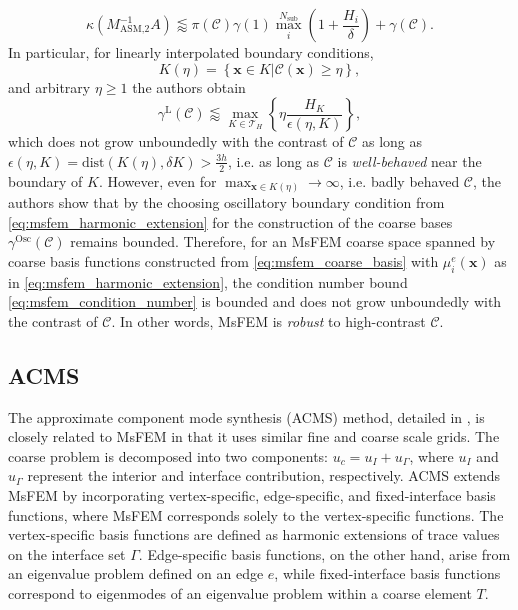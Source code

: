 \begin{equation}
    \kappa(M^{-1}_{\text{ASM,2}}A) \lessapprox \pi(\mathcal{C})\gamma(1)\max_i^{N_{\text{sub}}}\left(1+\frac{H_i}{\delta}\right) + \gamma(\mathcal{C}).
    \label{eq:msfem_condition_number}
\end{equation}
In particular, for linearly interpolated boundary conditions, 
\[
    K(\eta) = \left\{\mathbf{x} \in K | \mathcal{C}(\mathbf{x}) \geq \eta\right\},
\]
and arbitrary $\eta\geq 1$ the authors obtain \cite[Theorem 4.3]{msfem_coarse_space_Graham_2007}
\[
    \gamma^{\text{L}}(\mathcal{C}) \lessapprox \max_{K\in\mathcal{T}_H} \left\{\eta\frac{H_K}{\epsilon(\eta,K)}\right\},
\]
which does not grow unboundedly with the contrast of $\mathcal{C}$ as long as $\epsilon(\eta,K) = \text{dist}(K(\eta),\delta K) > \frac{3h}{2}$, i.e. as long as $\mathcal{C}$ is \textit{well-behaved} near the boundary of $K$. However, even for $\max_{\mathbf{x}\in K(\eta)} \rightarrow \infty$, i.e. badly behaved $\mathcal{C}$, the authors show that by the choosing oscillatory boundary condition from \cref{eq:msfem_harmonic_extension} for the construction of the coarse bases $\gamma^{\text{Osc}}(\mathcal{C})$ remains bounded. Therefore, for an MsFEM coarse space spanned by coarse basis functions constructed from \cref{eq:msfem_coarse_basis} with $\mu^e_i(\mathbf{x})$ as in \cref{eq:msfem_harmonic_extension}, the condition number bound \cref{eq:msfem_condition_number} is bounded and does not grow unboundedly with the contrast of $\mathcal{C}$. In other words, MsFEM is \textit{robust} to high-contrast $\mathcal{C}$.

\subsection{ACMS}
The approximate component mode synthesis (ACMS) method, detailed in \cite{acms_coarse_space_Heinlein2018}, is closely related to MsFEM in that it uses similar fine and coarse scale grids. The coarse problem is decomposed into two components: $u_c = u_I + u_{\Gamma}$, where $u_I$ and $u_{\Gamma}$ represent the interior and interface contribution, respectively. ACMS extends MsFEM by incorporating vertex-specific, edge-specific, and fixed-interface basis functions, where MsFEM corresponds solely to the vertex-specific functions. The vertex-specific basis functions are defined as harmonic extensions of trace values on the interface set $\Gamma$. Edge-specific basis functions, on the other hand, arise from an eigenvalue problem defined on an edge $e$, while fixed-interface basis functions correspond to eigenmodes of an eigenvalue problem within a coarse element $T$.
    

